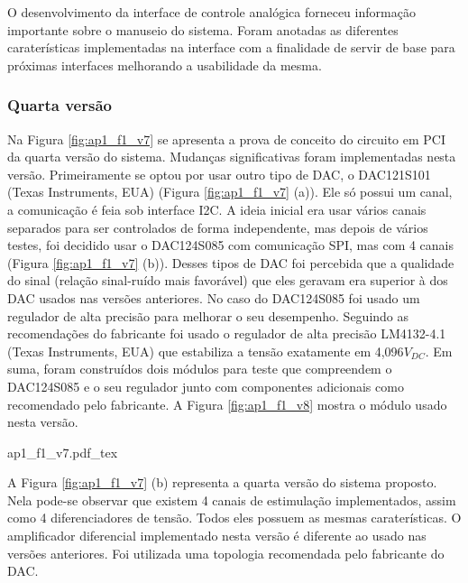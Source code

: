O desenvolvimento da interface de controle analógica forneceu informação importante sobre o manuseio do sistema. Foram anotadas as diferentes caraterísticas implementadas na interface com a finalidade de servir de base para próximas interfaces melhorando a usabilidade da mesma.


\subsubsection*{Quarta versão}

Na Figura \ref{fig:ap1_f1_v7} se apresenta a prova de conceito do circuito em \acrshort{PCI} da quarta versão do sistema. Mudanças significativas foram implementadas nesta versão.  Primeiramente se optou por usar outro tipo de \acrshort{DAC}, o DAC121S101 (Texas Instruments, EUA) (Figura \ref{fig:ap1_f1_v7} (a)). Ele só possui um canal, a comunicação é feia sob interface \acrshort{I2C}. A ideia inicial era usar vários canais separados para ser controlados de forma independente, mas depois de vários testes, foi decidido usar o DAC124S085 com comunicação \acrshort{SPI}, mas com 4 canais (Figura \ref{fig:ap1_f1_v7} (b)). Desses tipos de \acrshort{DAC} foi percebida que a qualidade do sinal (relação sinal-ruído mais favorável) que eles geravam era superior à dos \acrshort{DAC} usados nas versões anteriores. No caso do DAC124S085 foi usado um regulador de alta precisão para melhorar o seu desempenho. Seguindo as recomendações do fabricante foi usado o regulador de alta precisão LM4132-4.1 (Texas Instruments, EUA) que estabiliza a tensão exatamente em 4,096$V_{DC}$. Em suma, foram construídos dois módulos para teste que compreendem o DAC124S085 e o seu regulador junto com componentes adicionais como recomendado pelo fabricante. A Figura \ref{fig:ap1_f1_v8} mostra o módulo usado nesta versão.

\begin{figure*}[h]
    \centering %
    \small %
    \def\svgwidth{1\columnwidth}%
    {ap1_f1_v7.pdf_tex}
    \caption{PCIs da quarta versão do sistema, (a) com DAC121s085 e (b) com DAC124S085.}
    \label{fig:ap1_f1_v7}
\end{figure*}

A Figura \ref{fig:ap1_f1_v7} (b) representa a quarta versão do sistema proposto. Nela pode-se observar que existem 4 canais de estimulação implementados, assim como 4 diferenciadores de tensão. Todos eles possuem as mesmas caraterísticas. O amplificador diferencial implementado nesta versão é diferente ao usado nas versões anteriores. Foi utilizada uma topologia recomendada pelo fabricante do \acrshort{DAC}.

